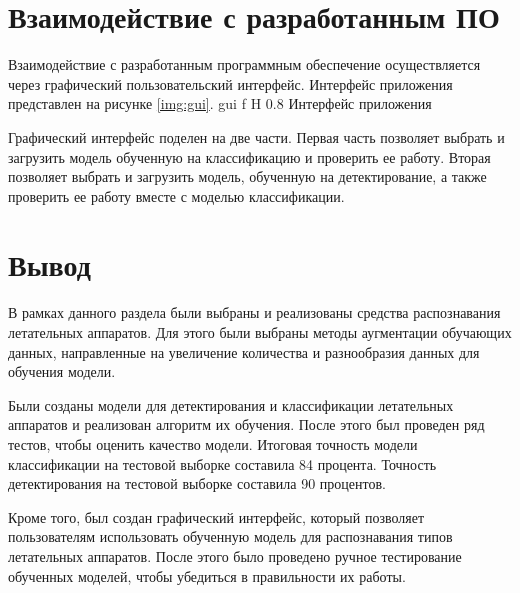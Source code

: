 \section{Взаимодействие с разработанным ПО}

Взаимодействие с разработанным программным обеспечение осуществляется через графический пользовательский интерфейс. Интерфейс приложения представлен на рисунке \ref{img:gui}.
{gui} %
{f} %
{H} %
{0.8\textwidth} %
{Интерфейс приложения} %

Графический интерфейс поделен на две части. Первая часть позволяет выбрать и загрузить модель обученную на классификацию и проверить ее работу. Вторая позволяет выбрать и загрузить модель, обученную на детектирование, а также проверить ее работу вместе с моделью классификации.

\section{Вывод}

В рамках данного раздела были выбраны и реализованы средства распознавания летательных аппаратов. Для этого были выбраны методы аугментации обучающих данных, направленные на увеличение количества и разнообразия данных для обучения модели. 

Были созданы модели для детектирования и классификации летательных аппаратов и реализован алгоритм их обучения. После этого был проведен ряд тестов, чтобы оценить качество модели. Итоговая точность модели классификации на тестовой выборке составила 84 процента. Точность детектирования на тестовой выборке составила 90 процентов.

Кроме того, был создан графический интерфейс, который позволяет пользователям использовать обученную модель для распознавания типов летательных аппаратов. После этого было проведено ручное тестирование обученных моделей, чтобы убедиться в правильности их работы.